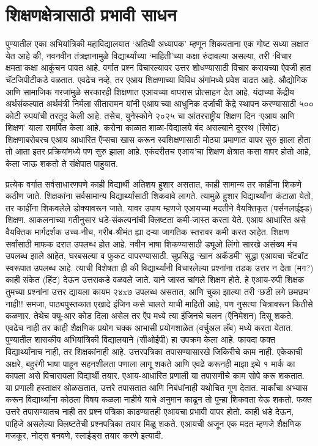\chapter{शिक्षणक्षेत्रासाठी प्रभावी साधन}

पुण्यातील एका अभियांत्रिकी महाविद्यालयात `अतिथी अध्यापक' म्हणून शिकवताना एक गोष्ट सध्या लक्षात येत आहे की, नवनवीन तंत्रज्ञानामुळे विद्यार्थ्यांच्या `माहिती'च्या कक्षा रुंदावल्या असल्या, तरी `विचार क्षमता'कक्षा आकुंचन पावत आहे. वर्गात प्रश्न विचारल्यावर उत्तर शोधण्यासाठी विचार करायच्या ऐवजी हात चॅटजिपीटीकडे वळतात. एवढेच नव्हे, तर एआय शिक्षणाच्या विविध अंगांमध्ये प्रवेश वाढत आहे. औद्योगिक आणि सामाजिक गरजांमुळे सरकारही शिक्षणात एआयच्या वापरास प्रोत्साहन देत आहे.  यंदाच्या केंद्रीय अर्थसंकल्पात अर्थमंत्री निर्मला सीतारामन यांनी एआय'च्या आधुनिक दर्जाची केंद्रे स्थापन करण्यासाठी ५०० कोटी रुपयांची तरतूद केली आहे. तसेच, युनेस्कोने २०२५ चा आंतरराष्ट्रीय शिक्षण दिन `एआय आणि शिक्षण' याला समर्पित केला आहे. करोना काळात शाळा-विद्यालये बंद असल्याने दूरस्थ (रिमोट) शिक्षणाबरोबरच एआय आधारित ऍप्सचा खास करून स्वशिक्षणासाठी मोठ्या प्रमाणात वापर सुरु झाला होता तो आता इतर प्रक्रियांमध्ये पण सुरु झाला आहे. एकंदरीतच एआय'चा शिक्षण क्षेत्रात कसा वापर होतो आहे, केला जाऊ शकतो ते संक्षेपात पाहुयात.

प्रत्येक वर्गात सर्वसाधारणपणे काही विद्यार्थी अतिशय हुशार असतात, काही सामान्य तर काहींना शिकणे कठीण जाते. शिक्षकांना सर्वसामान्य विद्यार्थ्यांसाठी शिकवावे लागते. त्यामुळे हुशार विद्यार्थ्यांना कंटाळा येतो, तर काहींना शिकवलेले डोक्यावरून जाते. यावर उपाय म्हणजे एआयच्या मदतीने वैयक्तिकृत (पर्सनलाईझ्ड) शिक्षण. आकलनाच्या गतीनुसार धडे-संकल्पनांची क्लिष्टता कमी-जास्त करता येते. एआय आधारित असे वैयक्तिक मार्गदर्शक उच्च-नीच, गरीब-श्रीमंत ह्या दऱ्या जागतिक स्तरावर कमी करत आहेत. शिक्षण सर्वांसाठी माफक दरात उपलब्ध होत आहे.  नवीन भाषा शिकण्यासाठी ड्यूओ लिंगो सारखे असंख्य मंच उपलब्ध झाले आहेत, घरबसल्या व फुकट वापरण्यासाठी. सुप्रसिद्ध `खान अकॅडमी' सुद्धा एआयचा चॅटबॉट स्वरूपात उपलब्ध आहे. त्याची विशेषता ही की विद्यार्थ्यांनी विचारलेल्या प्रश्नांना तडक उत्तर न देता (मग?) काही संकेत (हिंट) देऊन उत्तराकडे वळवले जाते. याने जास्त चांगले शिक्षण होते. हे एआय-रुपी शिक्षक तुमच्या प्रश्नांना उत्तर द्यायला कायम २४x७ उपलब्ध असतात, आणि चुका झाल्या तरी `छडी लगे छमछम' नाही!!  समजा, पाठ्यपुस्तकात एखादे इंजिन कसे चालते याची माहिती आहे, पण नुसत्या चित्रावरून कितीसे कळणार. तेथेच क्यू-आर कोड दिला असेल तर ऍप मध्ये त्या इंजिनचे चलन (ऍनिमेशन) दिसू शकते. एवढेच नाही तर काही शैक्षणिक प्रयोग चक्क आभासी प्रयोगशाळेत (वर्चुअल लॅब) मध्ये करता येतात. पुण्यातील शासकीय अभियांत्रिकी विद्यालयाने (सीओईपी) हा उपक्रम केला आहे. फायदा फक्त विद्यार्थ्यांनाच नाही, तर शिक्षकांनाही आहे. उत्तरपत्रिका तपासण्यासारखे जिकिरीचे काम नाही. एकेकाची अक्षरे, बहुरंगी भाषा पाहून सहनशीलता पणाला लागू शकते आणि एवढे करूनही माझा इथे १ मार्क का कापला असे विचारायला विद्यार्थी तयार. एआय-आधारित प्रणाली या तपासणीचे काम सोपे करू शकतात. या प्रणाली हस्ताक्षर ओळखतात, उत्तरे तपासतात आणि निबंधांनाही यथोचित गुण देतात. मार्कांचा अभ्यास करून विद्यार्थ्यांना कोठला विषय कळला नाहीये याचे अनुमान काढून तो पुन्हा शिकवता येऊ शकतो. फक्त उत्तरे तपासण्यातच नाही तर प्रश्न पत्रिका काढण्यातही एआयचा प्रभावी वापर होतो. काही धडे देऊन, पाहिजे असलेल्या क्लिष्टतेची प्रश्नपत्रिका तयार मिळू शकते. एआयची अजून एक मदत म्हणजे शैक्षणिक मजकूर, नोट्स बनवणे, स्लाईड्स तयार करणे इत्यादी.

